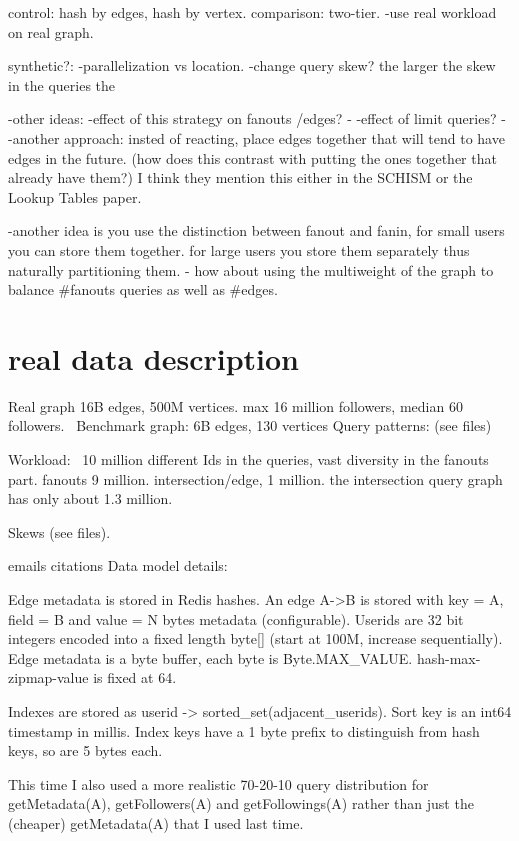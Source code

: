 \documentclass{article}
\begin{document}
control: hash by edges, hash by vertex. comparison: two-tier.
-use real workload on real graph.

synthetic?:
-parallelization vs location.
-change query skew? the larger the skew in the queries
the 


-other ideas:
-effect of this strategy on fanouts /edges? -
-effect of limit queries? -
-another approach: insted of reacting, place edges together that will tend to have edges in the future. (how does this contrast with putting the ones together that already have them?)
I think they mention this either in the SCHISM or the Lookup Tables paper.

-another idea is you use the distinction between fanout and fanin, for small users you can store them together. for large users you store them separately thus naturally partitioning them.
- how about using the multiweight of the graph  to balance #fanouts queries as well as #edges.

\section{real data description}

Real graph 16B edges, 500M vertices.
max 16 million followers, median 60 followers.
\
Benchmark graph: 6B edges, 130 vertices
Query patterns:  (see files)

Workload:
~10 million different Ids in the queries, vast diversity in the fanouts part.
fanouts 9 million. intersection/edge, 1 million.
the intersection query graph has only about 1.3 million.

Skews (see files).

emails citations
Data model details:

Edge metadata is stored in Redis hashes. An edge A->B is stored with key = A, field = B and value = N bytes metadata (configurable). Userids are 32 bit integers encoded into a fixed length byte[] (start at 100M, increase sequentially). Edge metadata is a byte buffer, each byte is Byte.MAX_VALUE. hash-max-zipmap-value is fixed at 64.

Indexes are stored as userid -> sorted_set(adjacent_userids). Sort key is an int64 timestamp in millis. Index keys have a 1 byte prefix to distinguish from hash keys, so are 5 bytes each.

This time I also used a more realistic 70-20-10 query distribution for getMetadata(A), getFollowers(A) and getFollowings(A) rather than just the (cheaper) getMetadata(A) that I used last time.
\end{document}
